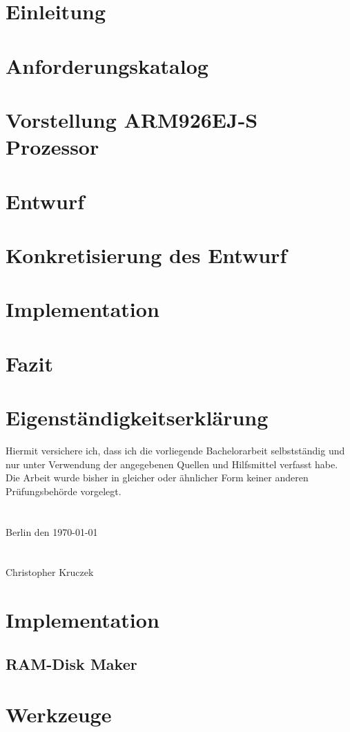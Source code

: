 \documentclass[fontsize=12pt,paper=A4,pagesize,DIV=calc,BCOR=1cm]{scrreprt}
\begin{document}
\onehalfspacing


\newpage
\thispagestyle{empty}
\mbox{}

\tableofcontents
{}
\listoftables
\listoffigures
\lstlistoflistings
{}
\chapter{Einleitung}

\chapter{Anforderungskatalog}

\chapter{Vorstellung ARM926EJ-S Prozessor}

\chapter{Entwurf}

\chapter{Konkretisierung des Entwurf}

\chapter{Implementation}

\chapter{Fazit}

\chapter{Eigenst\"andigkeitserkl\"arung}
Hiermit versichere ich, dass ich die vorliegende Bachelorarbeit selbstständig und nur unter 
Verwendung der angegebenen Quellen und Hilfsmittel verfasst habe. Die Arbeit wurde bisher 
in gleicher oder ähnlicher Form keiner anderen Prüfungsbehörde vorgelegt.\\\\\\
Berlin den \today \\\\\\
Christopher Kruczek
\printbibliography[heading=bibintoc]

\appendix
{}
\chapter{Implementation}
\section{RAM-Disk Maker}

\chapter{Werkzeuge}

\end{document}
